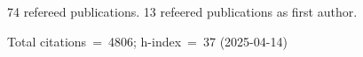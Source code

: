 74 refereed publications. 13 refeered publications as first author.

Total citations~=~4806; h-index~=~37 (2025-04-14)